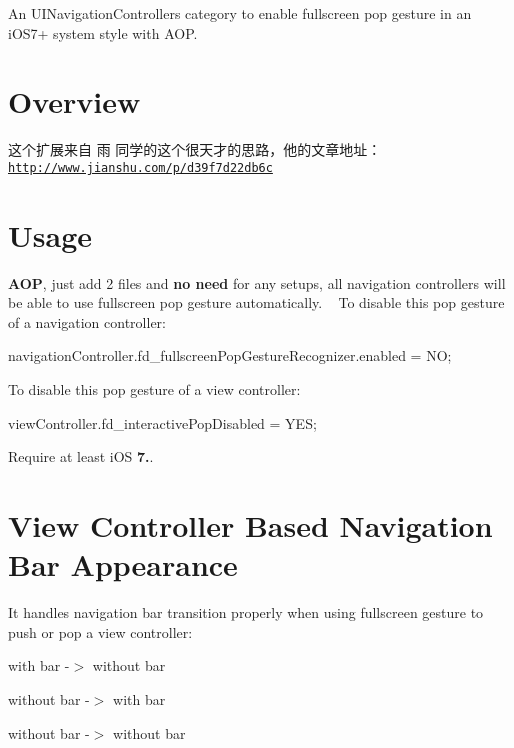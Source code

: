 An U\+I\+Navigation\+Controller\textquotesingle{}s category to enable fullscreen pop gesture in an i\+O\+S7+ system style with A\+OP.

\section*{Overview}



这个扩展来自 雨 同学的这个很天才的思路，他的文章地址：\href{http://www.jianshu.com/p/d39f7d22db6c}{\tt http\+://www.\+jianshu.\+com/p/d39f7d22db6c}

\section*{Usage}

{\bfseries A\+OP}, just add 2 files and {\bfseries no need} for any setups, all navigation controllers will be able to use fullscreen pop gesture automatically. ~\newline
 To disable this pop gesture of a navigation controller\+: ~\newline
 
\begin{DoxyCode}
navigationController.fd\_fullscreenPopGestureRecognizer.enabled = NO;
\end{DoxyCode}


To disable this pop gesture of a view controller\+: ~\newline
 
\begin{DoxyCode}
viewController.fd\_interactivePopDisabled = YES;
\end{DoxyCode}


Require at least i\+OS {\bfseries 7.}.

\section*{View Controller Based Navigation Bar Appearance}

It handles navigation bar transition properly when using fullscreen gesture to push or pop a view controller\+: ~\newline

\begin{DoxyItemize}
\item with bar -\/$>$ without bar
\item without bar -\/$>$ with bar
\item without bar -\/$>$ without bar
\end{DoxyItemize}



